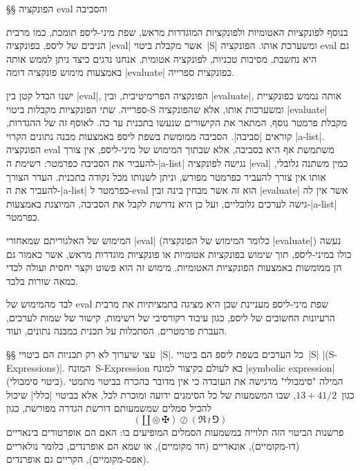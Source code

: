 §§ הפונקציה eval והסביבה

בנוסף לפונקציות האטומיות ולפונקציות המוגדרות מראש, שפת מיני-ליספ תומכת, כמו
מרבית הניבים של ליספ, בפונקציה \E|eval| אשר מקבלת ביטוי~\E|S| ומשערכת אותו.
הפונקציה eval גם היא נחשבת, מסיבות טכניות, לפונקציה אטומית. אנחנו נדגים כיצד
ניתן לממש אותה באמצעות מימוש פונקציה דומה \E|evaluate| כפונקצית ספרייה.

ישנו הבדל קטן בין \E|eval|, הפונקציה הפרימיטיבית, ובין \E|evaluate|, אותה נממש
כפונקציית ספרייה. שתי הפונקציות מקבלות ביטוי-S ומשערכות אותו, אלא שהפונקציה
\E|evaluate| מקבלת פרמטר נוסף, המתאר את הקישורים שנעשו בתכנית עד כה.
לאוסף זה של ההגדרות, קוראים \ע|סביבה|. הסביבה ממומשת בשפת ליספ באמצעות
מבנה נתונים הקרוי \E|a-list|. הפונקציה eval משתמשת אף היא בסביבה, אלא שבתוך
המימוש של מיני-ליספ, אין צורך להעביר את הסביבה כפרמטר: רשימת ה-\E|a-list| נגישה
לפונקציה \E|eval| כמין משתנה גלובלי, אותו אין צורך להעביר כפרמטר מפורש, וניתן
לשנותו מכל נקודה בתכנית. העדר הצורך להעביר את ה-\E|a-list| כפרמטר ל-eval הוא זה
אשר מבחין בינה ובין \E|evaluate| אשר אין לה גישה לערכים גלובליים, ועל כן היא
נדרשת לקבל את הסביבה, המיוצגת באמצעות-\E|a-list| כפרמטר.

המימוש של האלגוריתם שמאחורי \E|eval| (כלומר המימוש של הפונקציה \E|evaluate|)
נעשה כולו במיני-ליספ, תוך שימוש בפונקציות אטומיות או פונקציות מוגדרות מראש, אשר
כאמור גם הן ממומשות באמצעות הפונקציות האטומיות. מימוש זה הוא פשוט וקצר יחסית
ועולה לכדי כמאה שורות בלבד.

לבד מהמימוש של eval שפת מיני-ליספ מעניינת שכן היא מציגה בתמציתיות את מרבית
הרעיונות החשובים של ליספ, כגון עיבוד רקורסיבי של רשימות, קישור של שמות לערכים,
העברת פרמטרים, הסתכלות על תכנית כמבנה נתונים, ועוד.

§§ עצי שיערוך
לא רק תכניות הם ביטויי~\E|S|. כל הערכים בשפת ליספ הם ביטויי~\E|S|
\E|(S-Expressions)|. המונח~S-Expression בא לעולם כקיצור למונח \E|symbolic
expression| (ביטוי סימבולי). המילה "סימבולי" מדגישה את העובדה כי אין מדובר
בהכרח בביטוי מתמטי כגון~$13+41/2$, שבו המשמעות של כל הסימנים ידועה ומוכרת לכל,
אלא בביטוי \E|כללי| שיכול להכיל סמלים שמשמעותם דורשת הגדרה מפורשת, כגון
\begin{equation}
  (\amalg⊚✠) ⊘ (\Re≀⅁)
\end{equation}
פרשנות הביטוי הזה תלוייה במשמעות הסמלים המופיעים בו: האם הם אופרטורים בינאריים
(דו-מקומיים), אונאריים (חד מקומיים), או שמא הם אופרנדים, כלומר נולאריים
(אפס-מקומיים), הקריים גם אופרנדים.

